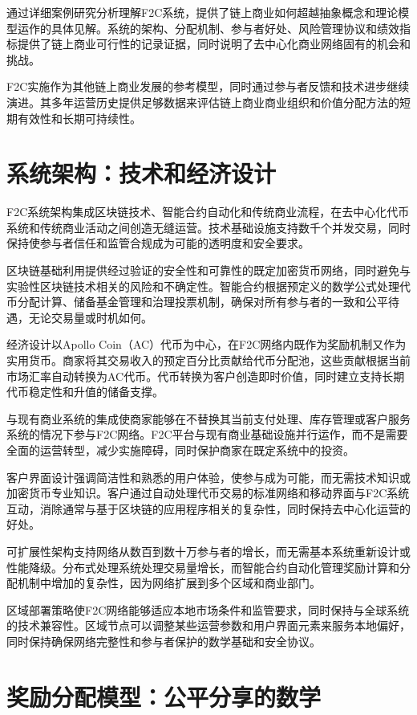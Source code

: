 \documentclass[
  Letterpaper,
]{scrbook}
\begin{document}
通过详细案例研究分析理解F2C系统，提供了链上商业如何超越抽象概念和理论模型运作的具体见解。系统的架构、分配机制、参与者好处、风险管理协议和绩效指标提供了链上商业可行性的记录证据，同时说明了去中心化商业网络固有的机会和挑战。

F2C实施作为其他链上商业发展的参考模型，同时通过参与者反馈和技术进步继续演进。其多年运营历史提供足够数据来评估链上商业商业组织和价值分配方法的短期有效性和长期可持续性。

\section{系统架构：技术和经济设计}\label{ux7cfbux7edfux67b6ux6784ux6280ux672fux548cux7ecfux6d4eux8bbeux8ba1}

F2C系统架构集成区块链技术、智能合约自动化和传统商业流程，在去中心化代币系统和传统商业活动之间创造无缝运营。技术基础设施支持数千个并发交易，同时保持使参与者信任和监管合规成为可能的透明度和安全要求。

区块链基础利用提供经过验证的安全性和可靠性的既定加密货币网络，同时避免与实验性区块链技术相关的风险和不确定性。智能合约根据预定义的数学公式处理代币分配计算、储备基金管理和治理投票机制，确保对所有参与者的一致和公平待遇，无论交易量或时机如何。

经济设计以Apollo
Coin（AC）代币为中心，在F2C网络内既作为奖励机制又作为实用货币。商家将其交易收入的预定百分比贡献给代币分配池，这些贡献根据当前市场汇率自动转换为AC代币。代币转换为客户创造即时价值，同时建立支持长期代币稳定性和升值的储备支撑。

与现有商业系统的集成使商家能够在不替换其当前支付处理、库存管理或客户服务系统的情况下参与F2C网络。F2C平台与现有商业基础设施并行运作，而不是需要全面的运营转型，减少实施障碍，同时保护商家在既定系统中的投资。

客户界面设计强调简洁性和熟悉的用户体验，使参与成为可能，而无需技术知识或加密货币专业知识。客户通过自动处理代币交易的标准网络和移动界面与F2C系统互动，消除通常与基于区块链的应用程序相关的复杂性，同时保持去中心化运营的好处。

可扩展性架构支持网络从数百到数十万参与者的增长，而无需基本系统重新设计或性能降级。分布式处理系统处理交易量增长，而智能合约自动化管理奖励计算和分配机制中增加的复杂性，因为网络扩展到多个区域和商业部门。

区域部署策略使F2C网络能够适应本地市场条件和监管要求，同时保持与全球系统的技术兼容性。区域节点可以调整某些运营参数和用户界面元素来服务本地偏好，同时保持确保网络完整性和参与者保护的数学基础和安全协议。

\section{奖励分配模型：公平分享的数学}\label{ux5956ux52b1ux5206ux914dux6a21ux578bux516cux5e73ux5206ux4eabux7684ux6570ux5b66}
\end{document}
